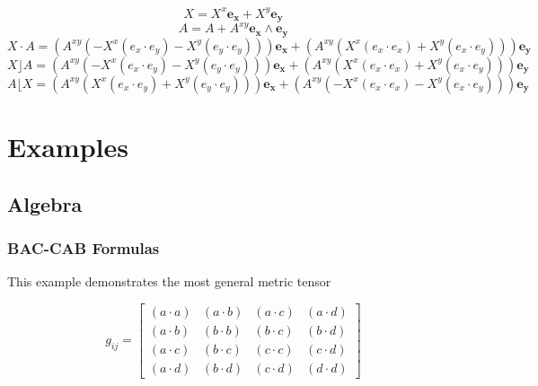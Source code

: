 \documentclass[10pt]{article}
\newcommand{\lp}{\left (}
\newcommand{\rp}{\right )}
\newcommand{\W}{\wedge}
\begin{document}
\begin{equation*} X = X^{x}\bm{e_{x}}+X^{y}\bm{e_{y}} \end{equation*}
\begin{equation*} A = A+A^{xy}\bm{e_{x}\W e_{y}} \end{equation*}
\begin{equation*} X\cdot A = \left ( A^{xy} \left(- X^{x} \lp e_{x}\cdot e_{y}\rp  - X^{y} \lp e_{y}\cdot e_{y}\rp \right)\right ) \bm{e_{x}}+\left ( A^{xy} \left(X^{x} \lp e_{x}\cdot e_{x}\rp  + X^{y} \lp e_{x}\cdot e_{y}\rp \right)\right ) \bm{e_{y}} \end{equation*}
\begin{equation*} X\rfloor A = \left ( A^{xy} \left(- X^{x} \lp e_{x}\cdot e_{y}\rp  - X^{y} \lp e_{y}\cdot e_{y}\rp \right)\right ) \bm{e_{x}}+\left ( A^{xy} \left(X^{x} \lp e_{x}\cdot e_{x}\rp  + X^{y} \lp e_{x}\cdot e_{y}\rp \right)\right ) \bm{e_{y}} \end{equation*}
\begin{equation*} A\lfloor X = \left ( A^{xy} \left(X^{x} \lp e_{x}\cdot e_{y}\rp  + X^{y} \lp e_{y}\cdot e_{y}\rp \right)\right ) \bm{e_{x}}+\left ( A^{xy} \left(- X^{x} \lp e_{x}\cdot e_{x}\rp  - X^{y} \lp e_{x}\cdot e_{y}\rp \right)\right ) \bm{e_{y}} \end{equation*}
\normalsize

\section{Examples}

\subsection{Algebra}

\subsubsection{BAC-CAB Formulas}

This example demonstrates the most general metric tensor

  \begin{equation}
  g_{ij} = \left [ \begin{array}{cccc} \lp a\cdot a\rp  & \lp a\cdot b\rp  & \lp a\cdot c\rp  & \lp a\cdot d\rp  \\
  \lp a\cdot b\rp  & \lp b\cdot b\rp  & \lp b\cdot c\rp  & \lp b\cdot d\rp  \\
  \lp a\cdot c\rp  & \lp b\cdot c\rp  & \lp c\cdot c\rp  & \lp c\cdot d\rp  \\
  \lp a\cdot d\rp  & \lp b\cdot d\rp  & \lp c\cdot d\rp  & \lp d\cdot d\rp
  \end{array}\right ]
  \end{equation}
\end{document}
